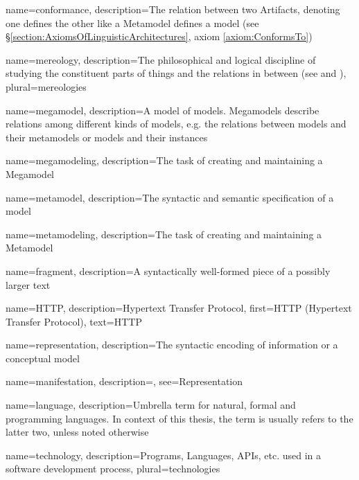 {
    name={conformance},
    description={The relation between two \glspl{Artifact}, denoting one defines the other like a \gls{Metamodel} defines a model (see §\ref{section:AxiomsOfLinguisticArchitectures}, axiom \ref{axiom:ConformsTo})}
}

{
    name={mereology},
    description={The philosophical and logical discipline of studying the constituent parts of things and the relations in between (see \cite{DBLP:journals/dke/Varzi96} and \cite{SEP:Mereology})},
    plural={mereologies}
}

{
    name={megamodel},
    description={A model of models. Megamodels describe relations among different kinds of models, e.g. the relations between models and their metamodels or models and their instances}
}

{
    name={megamodeling},
    description={The task of creating and maintaining a \gls{Megamodel}}
}

{
    name={metamodel},
    description={The syntactic and semantic specification of a model}
}

{
    name={metamodeling},
    description={The task of creating and maintaining a \gls{Metamodel}}
}

{
    name={fragment},
    description={A syntactically well-formed piece of a possibly larger text}
}

{
    name=HTTP,
    description={Hypertext Transfer Protocol},
    first={HTTP (Hypertext Transfer Protocol)},
    text={HTTP}
}

{
    name={representation},
    description={The syntactic encoding of information or a conceptual model}
}

{
    name={manifestation},
    description={},
    see={Representation}   
}

{
    name={language},
    description={Umbrella term for natural, formal and programming languages. In context of this thesis, the term is usually refers to the latter two, unless noted otherwise}
}

{
    name={technology},
    description={Programs, \glspl{Language}, \glspl{API}, etc. used in a software development process},
    plural={technologies}
}

